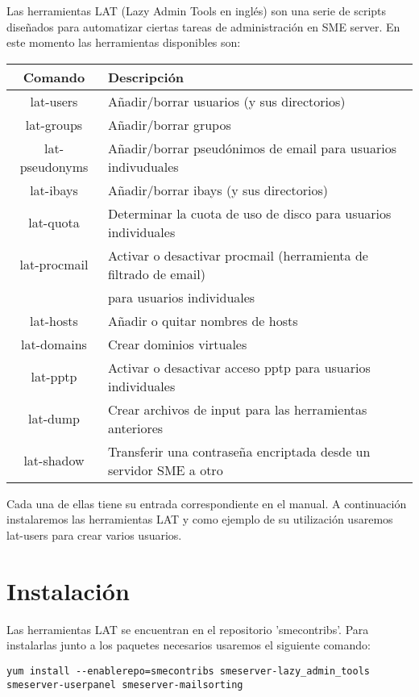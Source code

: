 Las herramientas LAT (Lazy Admin Tools en inglés) son una serie de scripts diseñados para automatizar ciertas tareas de administración en SME server. En este momento las herramientas disponibles son:\\

\begin{longtable}{ c | l }
  \textbf{Comando} & \textbf{Descripción} \\\hline
  lat-users & Añadir/borrar usuarios (y sus directorios)\\
  lat-groups & Añadir/borrar grupos\\
  lat-pseudonyms & Añadir/borrar pseudónimos de email para usuarios indivuduales\\
  lat-ibays & Añadir/borrar ibays (y sus directorios)\\
  lat-quota & Determinar la cuota de uso de disco para usuarios individuales\\
  lat-procmail & Activar o desactivar procmail (herramienta de filtrado de email) \\
  & para usuarios individuales\\
  lat-hosts & Añadir o quitar nombres de hosts\\
  lat-domains & Crear dominios virtuales\\
  lat-pptp & Activar o desactivar acceso pptp para usuarios individuales\\
  lat-dump & Crear archivos de input para las herramientas anteriores\\
  lat-shadow & Transferir una contraseña encriptada desde un servidor SME a otro\\
\end{longtable}

Cada una de ellas tiene su entrada correspondiente en el manual. A continuación instalaremos las herramientas LAT y como ejemplo de su utilización usaremos lat-users para crear varios usuarios.

\section{Instalación}

Las herramientas LAT se encuentran en el repositorio 'smecontribs'. Para instalarlas junto a los paquetes necesarios usaremos el siguiente comando:

\begin{lstlisting}
yum install --enablerepo=smecontribs smeserver-lazy_admin_tools smeserver-userpanel smeserver-mailsorting
\end{lstlisting}

